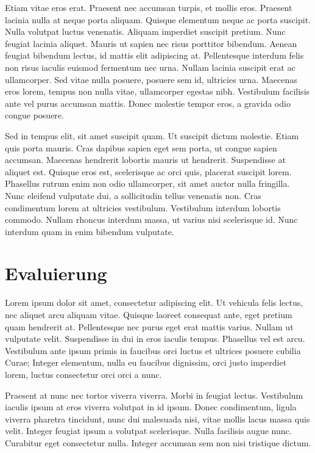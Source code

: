 \documentclass[12pt,oneside,a4paper,parskip]{scrbook}
\begin{document}
Etiam vitae eros erat. Praesent nec accumsan turpis, et mollis eros. Praesent lacinia nulla at neque porta aliquam. Quisque elementum neque ac porta suscipit. Nulla volutpat luctus venenatis. Aliquam imperdiet suscipit pretium. Nunc feugiat lacinia aliquet. Mauris ut sapien nec risus porttitor bibendum. Aenean feugiat bibendum lectus, id mattis elit adipiscing at. Pellentesque interdum felis non risus iaculis euismod fermentum nec urna. Nullam lacinia suscipit erat ac ullamcorper. Sed vitae nulla posuere, posuere sem id, ultricies urna. Maecenas eros lorem, tempus non nulla vitae, ullamcorper egestas nibh. Vestibulum facilisis ante vel purus accumsan mattis. Donec molestie tempor eros, a gravida odio congue posuere.

Sed in tempus elit, sit amet suscipit quam. Ut suscipit dictum molestie. Etiam quis porta mauris. Cras dapibus sapien eget sem porta, ut congue sapien accumsan. Maecenas hendrerit lobortis mauris ut hendrerit. Suspendisse at aliquet est. Quisque eros est, scelerisque ac orci quis, placerat suscipit lorem. Phasellus rutrum enim non odio ullamcorper, sit amet auctor nulla fringilla. Nunc eleifend vulputate dui, a sollicitudin tellus venenatis non. Cras condimentum lorem at ultricies vestibulum. Vestibulum interdum lobortis commodo. Nullam rhoncus interdum massa, ut varius nisi scelerisque id. Nunc interdum quam in enim bibendum vulputate.


\chapter{Evaluierung}

Lorem ipsum dolor sit amet, consectetur adipiscing elit. Ut vehicula felis lectus, nec aliquet arcu aliquam vitae. Quisque laoreet consequat ante, eget pretium quam hendrerit at. Pellentesque nec purus eget erat mattis varius. Nullam ut vulputate velit. Suspendisse in dui in eros iaculis tempus. Phasellus vel est arcu. Vestibulum ante ipsum primis in faucibus orci luctus et ultrices posuere cubilia Curae; Integer elementum, nulla eu faucibus dignissim, orci justo imperdiet lorem, luctus consectetur orci orci a nunc.

Praesent at nunc nec tortor viverra viverra. Morbi in feugiat lectus. Vestibulum iaculis ipsum at eros viverra volutpat in id ipsum. Donec condimentum, ligula viverra pharetra tincidunt, nunc dui malesuada nisi, vitae mollis lacus massa quis velit. Integer feugiat ipsum a volutpat scelerisque. Nulla facilisis augue nunc. Curabitur eget consectetur nulla. Integer accumsan sem non nisi tristique dictum.
\end{document}
